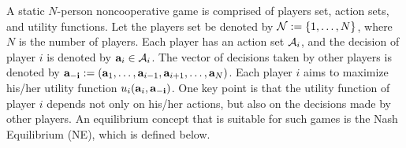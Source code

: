 A static $N$-person noncooperative game is comprised of players set, action sets, and utility functions. Let the players set be denoted by ${\cal N} := \{1,\dots,N\}$, where $N$ is the number of players. Each player has an action set ${\cal A}_i$, and the decision of player $i$ is denoted by ${\bf{a}}_i\in{\cal A}_i$. The vector of decisions taken by other players is denoted by $\mathbf{{\bf{a}}_{-i}}:=({\bf{a}}_1,\dots,{\bf{a}}_{i-1},{\bf{a}}_{i+1},\dots,{\bf{a}}_N)$. Each player $i$ aims to maximize his/her utility function $u_i({\bf{a}}_i,\mathbf{{\bf{a}}_{-i}})$. One key point is that the utility function of player $i$ depends not only on his/her actions, but also on the decisions made by other players. An equilibrium concept that is suitable for  such games is the Nash Equilibrium (NE), which is defined below. 

